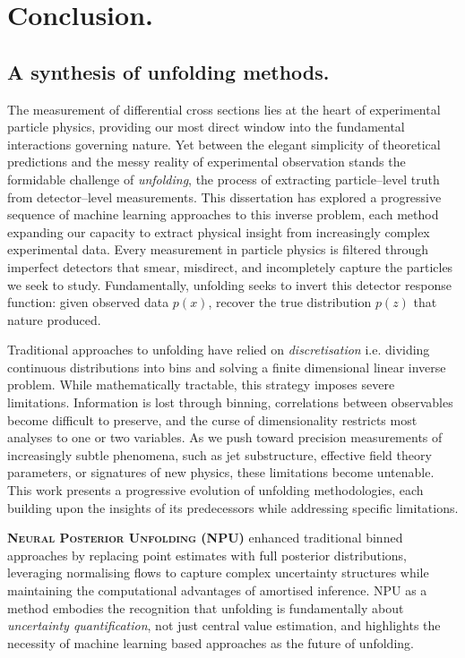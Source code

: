 \chapter{Conclusion.}
\label{chap:conclusion}
\chapterminitoc
\section{A synthesis of unfolding methods.}
    The measurement of differential cross sections lies at the heart of experimental particle physics, providing our most direct window into the fundamental interactions governing nature.
    Yet between the elegant simplicity of theoretical predictions and the messy reality of experimental observation stands the formidable challenge of \emph{unfolding}, the process of extracting particle--level truth from detector--level measurements.
    This dissertation has explored a progressive sequence of machine learning approaches to this inverse problem, each method expanding our capacity to extract physical insight from increasingly complex experimental data.
    Every measurement in particle physics is filtered through imperfect detectors that smear, misdirect, and incompletely capture the particles we seek to study.
    Fundamentally, unfolding seeks to invert this detector response function: given observed data \(p(x)\), recover the true distribution \(p(z)\) that nature produced.

    Traditional approaches to unfolding have relied on \emph{discretisation} i.e. dividing continuous distributions into bins and solving a finite dimensional linear inverse problem.
    While mathematically tractable, this strategy imposes severe limitations.
    Information is lost through binning, correlations between observables become difficult to preserve, and the curse of dimensionality restricts most analyses to one or two variables.
    As we push toward precision measurements of increasingly subtle phenomena, such as jet substructure, effective field theory parameters, or signatures of new physics, these limitations become untenable.
    This work presents a {progressive evolution} of unfolding methodologies, each building upon the insights of its predecessors while addressing specific limitations.
    
    \textbf{\textsc{Neural Posterior Unfolding} (NPU)} enhanced traditional binned approaches by replacing point estimates with full posterior distributions, leveraging normalising flows to capture complex uncertainty structures while maintaining the computational advantages of amortised inference.
    NPU as a method embodies the recognition that unfolding is fundamentally about \emph{uncertainty quantification}, not just central value estimation, and highlights the necessity of machine learning based approaches as the future of unfolding.
    
